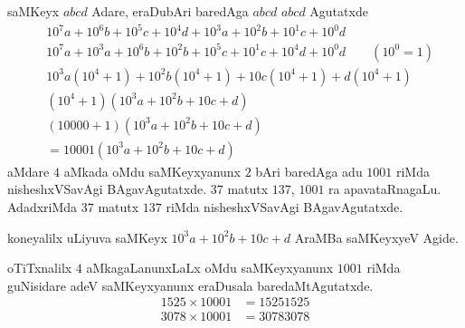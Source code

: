 saMKeyx $abcd$ Adare, eraDubAri baredAga $abcd$ $abcd$ Agutatxde
{\fontsize{10}{12}\selectfont
\begin{align*}
& 10^{7}a + 10^{6}b +10^{5}c +10^{4}d + 10^{3}a + 10^{2}b +10^{1}c +10^{0}d\\
& 10^{7}a +10^{3}a +10^{6}b +10^{2}b + 10^{5}c +10^{1}c + 10^{4}d +10^{0}d \qquad\text{$\left(10^0 =1\right)$}\\
& 10^3a\left(10^4 +1\right) +10^{2}b\left(10^4 +1\right) + 10c\left(10^4 +1\right) +d \left(10^4+ 1\right)\\
&\left(10^4 +1\right) \left(10^{3}a + 10^{2}b +10c + d\right)\\
&(10000+1)\left(10^{3}a + 10^{2}b+10c+d\right)\\
&=10001\left(10^{3}a + 10^{2}b +10c +d\right)
 \end{align*}}
aMdare $4$ aMkada oMdu saMKeyxyanunx $2$ bAri baredAga adu $1001$ riMda nisheshxVSa\-vAgi BAgavAgutatxde. $37$ matutx $137$, $1001$ ra apavataRnagaLu. AdadxriMda $37$ matutx $137$ riMda nisheshxVSavAgi BAgavAgutatxde.

koneyalilx uLiyuva saMKeyx $10^{3}a+10^{2}b+10c+d$ AraMBa saMKeyxyeV Agide.

oTiTxnalilx $4$ aMkagaLanunxLaLx oMdu saMKeyxyanunx $1001$ riMda guNisidare adeV saMKeyx\-yanunx eraDusala baredaMtAgutatxde. 
\begin{align*}
1525\times 10001 &= 15251525\\
3078 \times 10001 &= 30783078
\end{align*}
